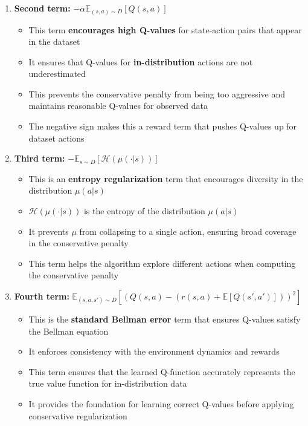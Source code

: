 \documentclass[12pt]{article}
\begin{document}
{{\begin{enumerate}
\begin{enumerate}
        \item \textbf{Second term:} $-\alpha \mathbb{E}_{(s,a) \sim D} [Q(s,a)]$
        \begin{itemize}
            \item This term \textbf{encourages high Q-values} for state-action pairs that appear in the dataset
            \item It ensures that Q-values for \textbf{in-distribution} actions are not underestimated
            \item This prevents the conservative penalty from being too aggressive and maintains reasonable Q-values for observed data
            \item The negative sign makes this a reward term that pushes Q-values up for dataset actions
        \end{itemize}
        
        \item \textbf{Third term:} $-\mathbb{E}_{s \sim D} [\mathcal{H}(\mu(\cdot|s))]$
        \begin{itemize}
            \item This is an \textbf{entropy regularization} term that encourages diversity in the distribution $\mu(a|s)$
            \item $\mathcal{H}(\mu(\cdot|s))$ is the entropy of the distribution $\mu(a|s)$
            \item It prevents $\mu$ from collapsing to a single action, ensuring broad coverage in the conservative penalty
            \item This term helps the algorithm explore different actions when computing the conservative penalty
        \end{itemize}
        
        \item \textbf{Fourth term:} $\mathbb{E}_{(s,a,s') \sim D} \left[ (Q(s,a) - (r(s,a) + \mathbb{E}[Q(s',a')]))^2 \right]$
        \begin{itemize}
            \item This is the \textbf{standard Bellman error} term that ensures Q-values satisfy the Bellman equation
            \item It enforces consistency with the environment dynamics and rewards
            \item This term ensures that the learned Q-function accurately represents the true value function for in-distribution data
            \item It provides the foundation for learning correct Q-values before applying conservative regularization
        \end{itemize}
    \end{enumerate}
    

\end{enumerate}}}
\end{document}
